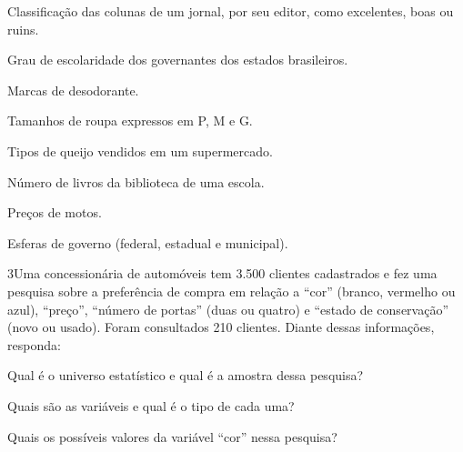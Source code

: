 \begin{escolha}
\item
  Classificação das colunas de um jornal, por seu editor, como
  excelentes, boas ou ruins.\\

\item
  Grau de escolaridade dos governantes dos estados brasileiros.\\

\item
  Marcas de desodorante.\\

\item
  Tamanhos de roupa expressos em P, M e G.\\

\item
  Tipos de queijo vendidos em um supermercado.\\

\item
  Número de livros da biblioteca de uma escola.\\

\item
  Preços de motos.\\

\item
  Esferas de governo (federal, estadual e municipal).\\
\end{escolha}

\num{3}Uma concessionária de automóveis tem 3.500 clientes cadastrados e
fez uma pesquisa sobre a preferência de compra em relação a “cor”
(branco, vermelho ou azul), “preço”, “número de portas” (duas ou
quatro) e “estado de conservação” (novo ou usado). Foram consultados
210 clientes. Diante dessas informações, responda:

\begin{escolha}
\item
  Qual é o universo estatístico e qual é a amostra dessa pesquisa?\\

\item
  Quais são as variáveis e qual é o tipo de cada uma?\\

\item
  Quais os possíveis valores da variável “cor” nessa pesquisa?\\
\end{escolha}


